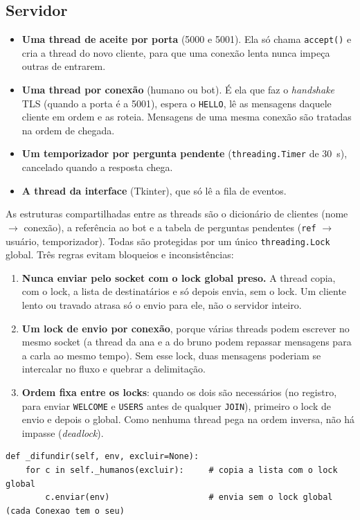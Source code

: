 \documentclass[11pt,a4paper]{article}
\newcommand{\cod}[1]{\texttt{#1}}
\begin{document}
\subsection{Servidor}
\begin{itemize}
  \item \textbf{Uma thread de aceite por porta} (5000 e 5001). Ela só chama \cod{accept()} e cria
        a thread do novo cliente, para que uma conexão lenta nunca impeça outras de entrarem.
  \item \textbf{Uma thread por conexão} (humano ou bot). É ela que faz o \emph{handshake} TLS
        (quando a porta é a 5001), espera o \cod{HELLO}, lê as mensagens daquele cliente em ordem e
        as roteia. Mensagens de uma mesma conexão são tratadas na ordem de chegada.
  \item \textbf{Um temporizador por pergunta pendente} (\cod{threading.Timer} de 30~s), cancelado
        quando a resposta chega.
  \item \textbf{A thread da interface} (Tkinter), que só lê a fila de eventos.
\end{itemize}

As estruturas compartilhadas entre as threads são o dicionário de clientes (nome $\to$ conexão), a
referência ao bot e a tabela de perguntas pendentes (\cod{ref} $\to$ usuário, temporizador). Todas
são protegidas por um único \cod{threading.Lock} global. Três regras evitam bloqueios e
inconsistências:
\begin{enumerate}
  \item \textbf{Nunca enviar pelo socket com o lock global preso.} A thread copia, com o lock, a
        lista de destinatários e só depois envia, sem o lock. Um cliente lento ou travado atrasa
        só o envio para ele, não o servidor inteiro.
  \item \textbf{Um lock de envio por conexão}, porque várias threads podem escrever no mesmo socket
        (a thread da ana e a do bruno podem repassar mensagens para a carla ao mesmo tempo). Sem esse
        lock, duas mensagens poderiam se intercalar no fluxo e quebrar a delimitação.
  \item \textbf{Ordem fixa entre os locks}: quando os dois são necessários (no registro, para
        enviar \cod{WELCOME} e \cod{USERS} antes de qualquer \cod{JOIN}), primeiro o lock de envio e
        depois o global. Como nenhuma thread pega na ordem inversa, não há impasse
        (\emph{deadlock}).
\end{enumerate}

\begin{lstlisting}[style=py]
def _difundir(self, env, excluir=None):
    for c in self._humanos(excluir):     # copia a lista com o lock global
        c.enviar(env)                    # envia sem o lock global (cada Conexao tem o seu)
\end{lstlisting}
\end{document}
